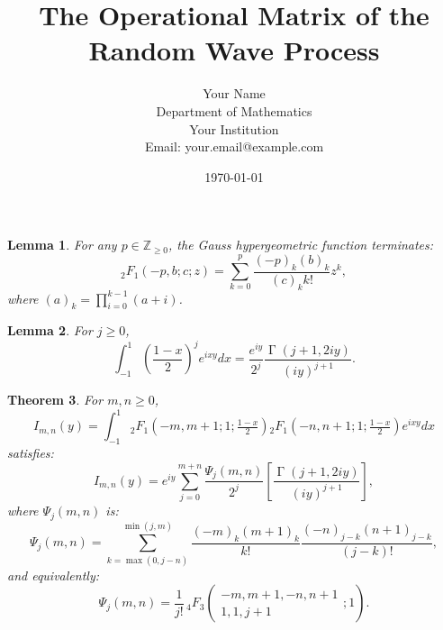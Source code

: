 \documentclass[12pt]{article}
\title{The Operational Matrix of the Random Wave Process}
\author{Your Name \\ Department of Mathematics \\ Your Institution \\ Email: your.email@example.com}
\date{\today}
\newtheorem{theorem}{Theorem}
\newtheorem{lemma}[theorem]{Lemma}
\DeclareMathOperator{\gamma}{\Gamma}
\begin{document}
\maketitle

\begin{lemma}\label{lem:HyperExpansions}
For any \( p \in \mathbb{Z}_{\geq 0} \), the Gauss hypergeometric function terminates:
\begin{equation}\label{eq:HyperSeries}
{}_2F_1(-p, b; c; z) = \sum_{k=0}^p \frac{(-p)_k (b)_k}{(c)_k k!} z^k,
\end{equation}
where \((a)_k = \prod_{i=0}^{k-1}(a+i)\).
\end{lemma}

\begin{lemma}\label{lem:IntegralGamma}
For \( j \geq 0 \), 
\begin{equation}\label{eq:IntegralGamma}
\int_{-1}^1 \left(\frac{1-x}{2}\right)^j e^{ixy}dx = \frac{e^{iy}}{2^j}\frac{\gamma(j+1,2iy)}{(iy)^{j+1}}.
\end{equation}
\end{lemma}

\begin{theorem}\label{thm:MainResult}
For \( m,n \geq 0 \),
\[
I_{m,n}(y) = \int_{-1}^1 {}_2F_1\left(-m,m+1;1;\tfrac{1-x}{2}\right){}_2F_1\left(-n,n+1;1;\tfrac{1-x}{2}\right)e^{ixy}dx
\]
satisfies:
\[
I_{m,n}(y) = e^{iy}\sum_{j=0}^{m+n}\frac{\Psi_j(m,n)}{2^j}\left[\frac{\gamma(j+1,2iy)}{(iy)^{j+1}}\right],
\]
where \( \Psi_j(m,n) \) is:
\begin{equation}\label{eq:PsiSum}
\Psi_j(m,n) = \sum_{k=\max(0,j-n)}^{\min(j,m)} \frac{(-m)_k(m+1)_k}{k!}\frac{(-n)_{j-k}(n+1)_{j-k}}{(j-k)!},
\end{equation}
and equivalently:
\begin{equation}\label{eq:4F3}
\Psi_j(m,n) = \frac{1}{j!}\,{}_4F_3\left(\begin{array}{c} -m, m+1, -n, n+1 \\ 1, 1, j+1 \end{array};1\right).
\end{equation}
\end{theorem}
\end{document}
